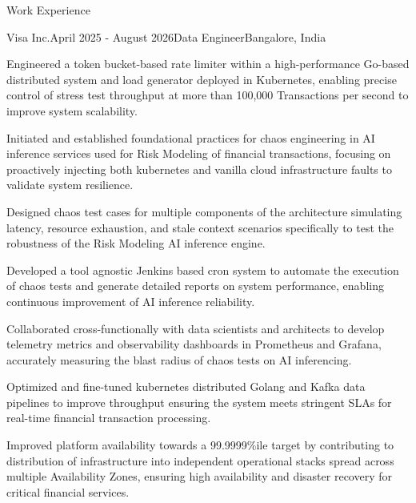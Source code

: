 \documentclass{resume} %
\begin{document}
\begin{rSection}{Work Experience}

    \begin{rSubsection}{Visa Inc.}{April 2025 - August 2026}{Data Engineer}{Bangalore, India}
        \item Engineered a token bucket-based rate limiter within a high-performance Go-based distributed system and load generator deployed in Kubernetes, enabling precise control of stress test throughput at more than 100,000 Transactions per second to improve system scalability.
        \item Initiated and established foundational practices for chaos engineering in AI inference services used for Risk Modeling of financial transactions, focusing on proactively injecting both kubernetes and vanilla cloud infrastructure faults to validate system resilience.
        \item Designed chaos test cases for multiple components of the architecture simulating latency, resource exhaustion, and stale context scenarios specifically to test the robustness of the Risk Modeling AI inference engine.
        \item Developed a tool agnostic Jenkins based cron system to automate the execution of chaos tests and generate detailed reports on system performance, enabling continuous improvement of AI inference reliability.
        \item Collaborated cross-functionally with data scientists and architects to develop telemetry metrics and observability dashboards in Prometheus and Grafana, accurately measuring the blast radius of chaos tests on AI inferencing.
        \item Optimized and fine-tuned kubernetes distributed Golang and Kafka data pipelines to improve throughput ensuring the system meets stringent SLAs for real-time financial transaction processing.                       
        \item Improved platform availability towards a 99.9999\%ile target by contributing to distribution of infrastructure into independent operational stacks spread across multiple Availability Zones, ensuring high availability and disaster recovery for critical financial services.
    \end{rSubsection}
    

\end{rSection}
\end{document}
